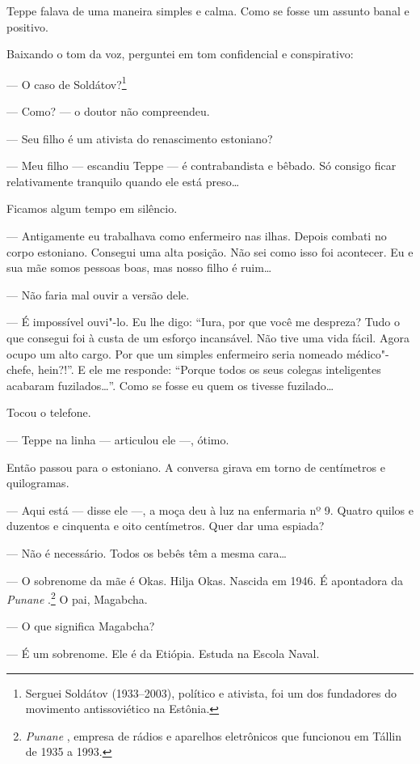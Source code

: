 Teppe falava de uma maneira simples e calma. Como se fosse um assunto
banal e positivo.

Baixando o tom da voz, perguntei em tom confidencial e conspirativo:

--- O caso de Soldátov?\footnote{Serguei Soldátov (1933--2003),
  político e ativista, foi um dos fundadores do movimento antissoviético
  na Estônia.}

--- Como? --- o doutor não compreendeu.

--- Seu filho é um ativista do renascimento estoniano?

--- Meu filho --- escandiu Teppe --- é contrabandista e bêbado. Só
consigo ficar relativamente tranquilo quando ele está preso\ldots{}

Ficamos algum tempo em silêncio.

--- Antigamente eu trabalhava como enfermeiro nas ilhas. Depois combati
no corpo estoniano. Consegui uma alta posição. Não sei como isso foi
acontecer. Eu e sua mãe somos pessoas boas, mas nosso filho é ruim\ldots{}

--- Não faria mal ouvir a versão dele.

--- É impossível ouvi"-lo. Eu lhe digo: ``Iura, por que você me despreza?
Tudo o que consegui foi à custa de um esforço incansável. Não tive uma
vida fácil. Agora ocupo um alto cargo. Por que um simples enfermeiro
seria nomeado médico"-chefe, hein?!''. E ele me responde: ``Porque todos
os seus colegas inteligentes acabaram fuzilados\ldots{}''. Como se fosse eu
quem os tivesse fuzilado\ldots{}

Tocou o telefone.

--- Teppe na linha --- articulou ele ---, ótimo.

Então passou para o estoniano. A conversa girava em torno de centímetros
e quilogramas.

--- Aqui está --- disse ele ---, a moça deu à luz na enfermaria nº 9.
Quatro quilos e duzentos e cinquenta e oito centímetros. Quer dar uma
espiada?

--- Não é necessário. Todos os bebês têm a mesma cara\ldots{}

--- O sobrenome da mãe é Okas. Hilja Okas. Nascida em 1946. É
apontadora da \emph{Punane }.\footnote{\emph{Punane
  }, empresa de rádios e aparelhos eletrônicos que funcionou em
  Tállin de 1935 a 1993.} O pai, Magabcha.

--- O que significa Magabcha?

--- É um sobrenome. Ele é da Etiópia. Estuda na Escola Naval.

